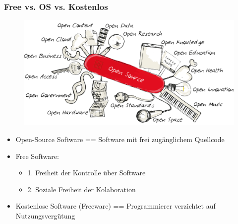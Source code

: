 


\begin{frame}
\frametitle{Free vs. OS vs. Kostenlos}
\begin{figure}
\includegraphics[scale=0.5]{resources/open_swiss_knife.png}
\end{figure}
\begin{itemize}
	\item Open-Source Software == Software mit frei zugänglichem Quellcode
	\item Free Software:
	\begin{itemize}
		\item 1. Freiheit der Kontrolle über Software
		\item 2. Soziale Freiheit der Kolaboration
	\end{itemize}
	\item Kostenlose Software (Freeware) == Programmierer verzichtet auf Nutzungsvergütung
\end{itemize}

\end{frame}

